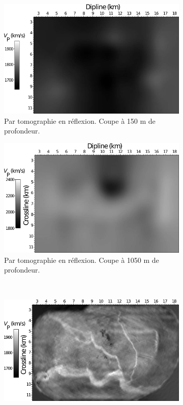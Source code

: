\begin{figure}[!h]
    \centering
    \begin{subfigure}[b]{0.4\textwidth}
        \includegraphics[width=\textwidth]{img/geophy1.png}
        \caption{ Par tomographie en réflexion. Coupe à 150 m de profondeur.}
        \label{}
    \end{subfigure}
    \hspace{0.5cm}
    \begin{subfigure}[b]{0.4\textwidth}
        \includegraphics[width=\textwidth]{img/geophy2.png}
        \caption{Par tomographie en réflexion. Coupe à 1050 m de profondeur.}
        \label{}
    \end{subfigure}\\[0.5cm]
    \begin{subfigure}[b]{0.4\textwidth}
        \includegraphics[width=\textwidth]{img/geophy3.png}

\end{subfigure}
\end{figure}
